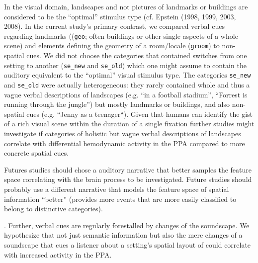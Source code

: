 \documentclass[english]{article}
\begin{document}
In the visual domain, landscapes and not pictures of landmarks or buildings are
considered to be the ``optimal'' stimulus type (cf. Epstein (1998, 1999, 2003,
2008).
In the current study's primary contrast, we compared verbal cues regarding
landmarks ((\texttt{geo}; often buildings or other single aspects of a whole
scene) and elements defining the geometry of a room/locale (\texttt{groom}) to
non-spatial cues.
We did not choose the categories that contained switches from one setting to
another (\texttt{se\_new} and \texttt{se\_old}) which one might assume to
contain the auditory equivalent to the ``optimal'' visual stimulus type.
The categories \texttt{se\_new} and \texttt{se\_old} were actually
heterogeneous: they rarely contained whole and thus a vague verbal descriptions
of landscapes (e.g. ``in a football stadium'', ``Forrest is running through the
jungle'') but mostly landmarks or buildings, and also non-spatial
cues (e.g. ``Jenny as a teenager``).
Given that humans can identify the gist of a rich visual scene within the
duration of a single fixation \citep{henderson2003human} further studies might
investigate if categories of holistic but vague verbal descriptions of
landscapes correlate with differential hemodynamic activity in the PPA compared
to more concrete spatial cues.

Futures studies should chose a auditory narrative that better samples the
feature space correlating with the brain process to be investigated.
Future studies should probably use a different narrative that models the feature
space of spatial information ``better'' (provides more events that are more
easily classified to belong to distinctive categories).

.
Further, verbal cues are regularly forestalled by changes of the soundscape.
We hypothesize that not just semantic information but also the mere changes of a
soundscape that cues a listener about a setting's spatial layout of could
correlate with increased activity in the PPA.
\end{document}
